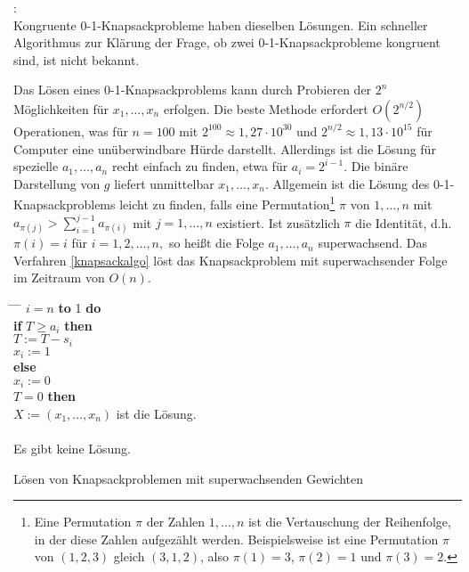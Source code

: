 \begin{refsegment}
\begin{enumerate}
\end{enumerate}

\begin{remark}{:}\\
Kongruente 0-1-Knapsackprobleme haben dieselben Lösungen.
Ein schneller Algorithmus zur Klärung der Frage, ob zwei 0-1-Knapsackprobleme kongruent sind, ist nicht bekannt.
\end{remark}

Das Lösen eines 0-1-Knapsackproblems kann durch Probieren der $ 2^n $   Möglichkeiten für $ x_1, \dots, x_n $   erfolgen. Die beste Methode erfordert $ O(2^{n/2}) $  Operationen, was für $ n=100 $  mit $ 2^{100} \approx 1,27 \cdot 10^{30} $  und  $ 2^{n/2} \approx 1,13 \cdot 10^{15} $ für Computer eine unüberwindbare Hürde darstellt.
Allerdings ist die Lösung für spezielle $ a_1, \dots, a_n $   recht einfach zu finden, etwa für $ a_i = 2^{i-1}. $  Die binäre Darstellung von $ g $ liefert unmittelbar $ x_1, \dots, x_n$. Allgemein ist die Lösung des 0-1-Knapsackproblems leicht zu finden, falls eine  Permutation\footnote{%
  Eine Permutation $\pi$ der Zahlen $1, \dots, n$ ist die
  Vertauschung der Reihenfolge, in der diese Zahlen aufgezählt werden.
  Beispielsweise ist eine Permutation $\pi$ von $(1,2,3)$ gleich $(3,1,2)$,
  also $\pi(1) = 3$, $\pi(2) = 1$ und $\pi(3) = 2$.
}
$ \pi $  von $ 1, \dots, n $  mit $ a_{\pi (j)} > \sum_{i=1}^{j-1} a_{\pi(i)} $
mit $ j =  1, \dots, n $ existiert.
Ist zusätzlich $ \pi $ die Identität, d.h. $ \pi(i)=i $ für $ i=1,2,\dots,n, $ so heißt die Folge $ a_1, \dots , a_n $ superwachsend.
Das Verfahren \ref{knapsackalgo} löst das Knapsackproblem mit superwachsender Folge im Zeitraum von $ O(n). $
\begin{cryptoprocedure}
\begin{tabbing}
\hspace*{0.5cm} \= \hspace*{0.5cm} \= \hspace*{0.5cm} \= \kill
{} $ i=n $ {\bf to} 1 {\bf do}\\
\>\> {\bf if} $ T\geq a_i $ {\bf then}\\
\>\> \> $ T:=T-s_i $\\
\>\>\> $ x_i:=1 $\\
\>\> {\bf else}\\
\>\>\> $ x_i:=0 $\\
 $ T=0 $ {\bf then}\\
\>\> $ X:=(x_1, \dots, x_n) $ ist die Lösung.\\
\\
\>\> Es gibt keine Lösung.
\end{tabbing}
\caption{Lösen von Knapsackproblemen mit superwachsenden Gewichten}
\label{knapsackalgo}
\end{cryptoprocedure}



\end{refsegment}
